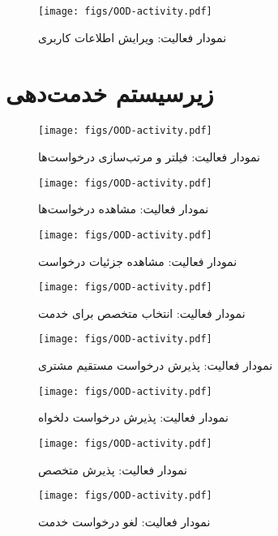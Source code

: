 \begin{figure}
	\centering
	\texttt{[image: figs/OOD-activity.pdf]}
	\caption{نمودار فعالیت: ویرایش اطلاعات کاربری}
\end{figure}
\FloatBarrier
\newpage


\section{زیرسیستم خدمت‌دهی}


\begin{figure}
	\centering
	\texttt{[image: figs/OOD-activity.pdf]}
	\caption{نمودار فعالیت: فیلتر و مرتب‌سازی درخواست‌ها}
\end{figure}
\FloatBarrier
\newpage

\begin{figure}
	\centering
	\texttt{[image: figs/OOD-activity.pdf]}
	\caption{نمودار فعالیت: مشاهده درخواست‌ها}
\end{figure}
\FloatBarrier
\newpage

\begin{figure}
	\centering
	\texttt{[image: figs/OOD-activity.pdf]}
	\caption{نمودار فعالیت: مشاهده جزئیات درخواست}
\end{figure}
\FloatBarrier
\newpage

\begin{figure}
	\centering
	\texttt{[image: figs/OOD-activity.pdf]}
	\caption{نمودار فعالیت: انتخاب متخصص برای خدمت}
\end{figure}
\FloatBarrier
\newpage

\begin{figure}
	\centering
	\texttt{[image: figs/OOD-activity.pdf]}
	\caption{نمودار فعالیت: پذیرش درخواست مستقیم مشتری}
\end{figure}
\FloatBarrier
\newpage

\begin{figure}
	\centering
	\texttt{[image: figs/OOD-activity.pdf]}
	\caption{نمودار فعالیت: پذیرش درخواست دلخواه}
\end{figure}
\FloatBarrier
\newpage

\begin{figure}
	\centering
	\texttt{[image: figs/OOD-activity.pdf]}
	\caption{نمودار فعالیت: پذیرش متخصص}
\end{figure}
\FloatBarrier
\newpage

\begin{figure}
	\centering
	\texttt{[image: figs/OOD-activity.pdf]}
	\caption{نمودار فعالیت: لغو درخواست خدمت}
\end{figure}
\FloatBarrier
\newpage

